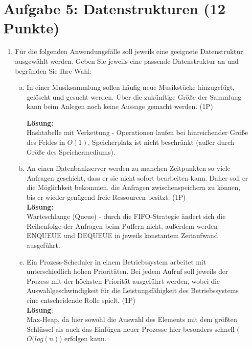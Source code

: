 \documentclass{scrartcl}
\begin{document}
\section*{Aufgabe 5: Datenstrukturen (12 Punkte)}
\begin{enumerate}[(1)]
\item Für die folgenden Anwendungsfälle soll jeweils eine geeignete Datenstruktur ausgewählt werden. Geben Sie jeweils eine passende Datenstruktur an und begründen Sie Ihre Wahl:
\begin{enumerate}[(a)]
\item In einer Musiksammlung sollen häufig neue Musikstücke hinzugefügt, gelöscht und gesucht werden. Über die zukünftige Größe der Sammlung kann beim Anlegen noch keine Aussage gemacht werden. (1P)
\pagebreak

\textbf{Lösung:}\\
Hashtabelle mit Verkettung - Operationen laufen bei hinreichender Größe des Feldes in $O(1)$, Speicherplatz ist nicht beschränkt (außer durch Größe des Speichermediums).
\item An einen Datenbankserver werden zu manchen Zeitpunkten so viele Anfragen geschickt, dass er sie nicht sofort bearbeiten kann. Daher soll er die Möglichkeit bekommen, die Anfragen zwischenspeichern zu können, bis er wieder genügend freie Ressourcen besitzt. (1P)\\
\textbf{Lösung:}\\
Warteschlange (Queue) - durch die FIFO-Strategie ändert sich die Reihenfolge der Anfragen beim Puffern nicht, außerdem werden ENQUEUE und DEQUEUE in jeweils konstantem Zeitaufwand ausgeführt.
\item Ein Prozess-Scheduler in einem Betriebssystem arbeitet mit unterschiedlich hohen Prioritäten. Bei jedem Aufruf soll jeweils der Prozess mit der höchsten Priorität ausgeführt werden, wobei die Auswahlgeschwindigkeit für die Leistungsfähigkeit des Betriebssystems eine entscheidende Rolle spielt. (1P)\\
\textbf{Lösung}:\\
Max-Heap, da hier sowohl die Auswahl des Elements mit dem größten Schlüssel als auch das Einfügen neuer Prozesse hier besonders schnell ($O(log(n)$) erfolgen kann. 
\end{enumerate}


\end{enumerate}
\end{document}

